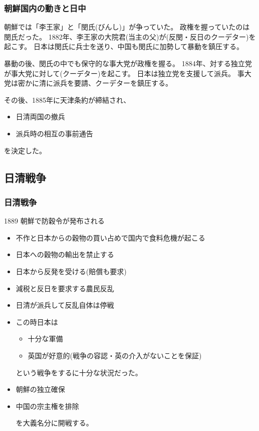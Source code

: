 \documentclass[12pt,fleqn]{ltjsarticle}
\begin{document}
\subsubsection{朝鮮国内の動きと日中}
朝鮮では「李王家」と「閔氏(びんし)」が争っていた。
政権を握っていたのは閔氏だった。
1882年、李王家の大院君(当主の父)が(反閔・反日のクーデター)を起こす。
日本は閔氏に兵士を送り、中国も閔氏に加勢して暴動を鎮圧する。

暴動の後、閔氏の中でも保守的な事大党が政権を握る。
1884年、対する独立党が事大党に対して(クーデター)を起こす。
日本は独立党を支援して派兵。
事大党は密かに清に派兵を要請、クーデターを鎮圧する。

その後、1885年に天津条約が締結され、
\begin{itemize}
\item 日清両国の撤兵
\item 派兵時の相互の事前通告
\end{itemize}
を決定した。

\subsection{日清戦争}
\subsubsection{日清戦争}
1889 朝鮮で防穀令が発布される
\begin{itemize}
\item 不作と日本からの穀物の買い占めで国内で食料危機が起こる
\item 日本への穀物の輸出を禁止する
\item 日本から反発を受ける(賠償も要求)
\end{itemize}

\begin{itemize}
\item 減税と反日を要求する農民反乱
\item 日清が派兵して反乱自体は停戦
\item この時日本は
\begin{itemize}
\item 十分な軍備
\item 英国が好意的(戦争の容認・英の介入がないことを保証)
\end{itemize}
という戦争をするに十分な状況だった。
\end{itemize}

\begin{itemize}
\item 朝鮮の独立確保
\item 中国の宗主権を排除

を大義名分に開戦する。
\end{itemize}
\end{document}
